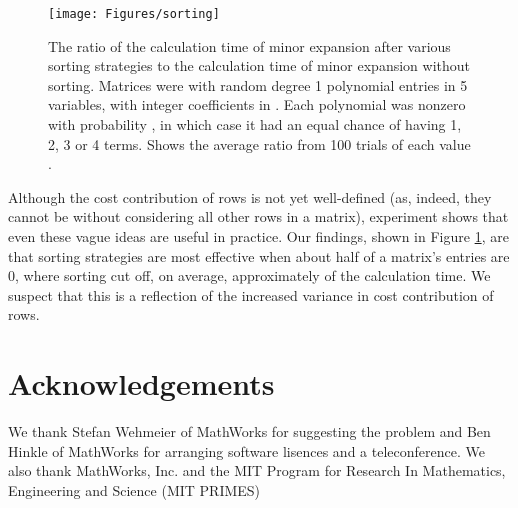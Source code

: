 \documentclass[12pt]{amsart}
\numberwithin{equation}{section}
\numberwithin{figure}{section}
\newcommand{\cc}{cost contribution\xspace}
\begin{document}
\begin{figure}[tb]
\texttt{[image: Figures/sorting]}
\vspace{-\baselineskip}
\caption{The ratio of the calculation time of minor expansion after various sorting strategies to the calculation time of minor expansion without sorting. Matrices were  with random degree 1 polynomial entries in 5 variables, with integer coefficients in . Each polynomial was nonzero with probability , in which case it had an equal chance of having 1, 2, 3 or 4 terms. Shows the average ratio from 100 trials of each  value .}
\label{sorting1}
\end{figure}

Although the \cc of rows is not yet well-defined (as, indeed, they cannot be without considering all other rows in a matrix), experiment shows that even these vague ideas are useful in practice. Our findings, shown in Figure \ref{sorting1}, are that sorting strategies are most effective when about half of a matrix's entries are 0, where sorting cut off, on average, approximately  of the calculation time. We suspect that this is a reflection of the increased variance in \cc of rows.




\section*{Acknowledgements}
We thank Stefan Wehmeier of MathWorks for suggesting the problem and Ben Hinkle of MathWorks for arranging software lisences and a teleconference. We also thank MathWorks, Inc. and the MIT Program for Research In Mathematics, Engineering and Science (MIT PRIMES)



\end{document}

